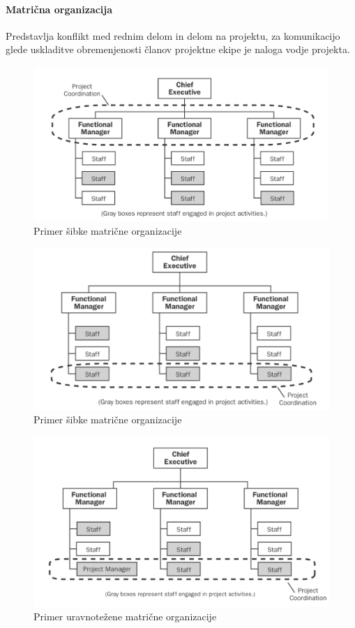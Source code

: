\documentclass[a4paper,12pt]{report}
\begin{document}
      \paragraph{Matrična organizacija} Predstavlja konflikt med rednim delom in delom na projektu, za komunikacijo glede uskladitve obremenjenosti članov projektne ekipe je naloga vodje projekta.
         \begin{figure}[h]
            \includegraphics[scale=0.375]{005.png}
            \caption{Primer šibke matrične organizacije}
         \end{figure}
         \begin{figure}[h]
            \includegraphics[scale=0.375]{006.png}
            \caption{Primer šibke matrične organizacije}
         \end{figure}
         \begin{figure}[h]
            \includegraphics[scale=0.375]{007.png}
            \caption{Primer uravnotežene matrične organizacije}
         \end{figure}
\end{document}
